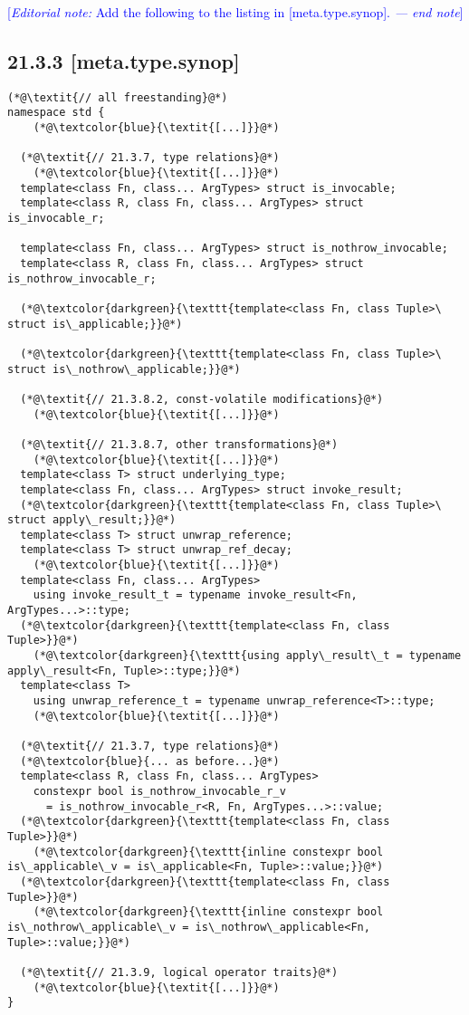 \documentclass{article}
\begin{document}
\textcolor{blue}{[\textit{Editorial note:} Add the following to the listing in [meta.type.synop]. \textit{--- end note}]}

\subsection*{21.3.3 [meta.type.synop]}
\begin{lstlisting}[style=base]
(*@\textit{// all freestanding}@*)
namespace std {
    (*@\textcolor{blue}{\textit{[...]}}@*)

  (*@\textit{// 21.3.7, type relations}@*)
    (*@\textcolor{blue}{\textit{[...]}}@*)
  template<class Fn, class... ArgTypes> struct is_invocable;
  template<class R, class Fn, class... ArgTypes> struct is_invocable_r;

  template<class Fn, class... ArgTypes> struct is_nothrow_invocable;
  template<class R, class Fn, class... ArgTypes> struct is_nothrow_invocable_r;

  (*@\textcolor{darkgreen}{\texttt{template<class Fn, class Tuple>\ struct is\_applicable;}}@*)

  (*@\textcolor{darkgreen}{\texttt{template<class Fn, class Tuple>\ struct is\_nothrow\_applicable;}}@*)
  
  (*@\textit{// 21.3.8.2, const-volatile modifications}@*)
    (*@\textcolor{blue}{\textit{[...]}}@*)

  (*@\textit{// 21.3.8.7, other transformations}@*)
    (*@\textcolor{blue}{\textit{[...]}}@*)
  template<class T> struct underlying_type;
  template<class Fn, class... ArgTypes> struct invoke_result;
  (*@\textcolor{darkgreen}{\texttt{template<class Fn, class Tuple>\ struct apply\_result;}}@*)
  template<class T> struct unwrap_reference;
  template<class T> struct unwrap_ref_decay;
    (*@\textcolor{blue}{\textit{[...]}}@*)
  template<class Fn, class... ArgTypes>
    using invoke_result_t = typename invoke_result<Fn, ArgTypes...>::type;
  (*@\textcolor{darkgreen}{\texttt{template<class Fn, class Tuple>}}@*)
    (*@\textcolor{darkgreen}{\texttt{using apply\_result\_t = typename apply\_result<Fn, Tuple>::type;}}@*)
  template<class T>
    using unwrap_reference_t = typename unwrap_reference<T>::type;
    (*@\textcolor{blue}{\textit{[...]}}@*)

  (*@\textit{// 21.3.7, type relations}@*)
  (*@\textcolor{blue}{... as before...}@*)
  template<class R, class Fn, class... ArgTypes>
    constexpr bool is_nothrow_invocable_r_v
      = is_nothrow_invocable_r<R, Fn, ArgTypes...>::value;
  (*@\textcolor{darkgreen}{\texttt{template<class Fn, class Tuple>}}@*)
    (*@\textcolor{darkgreen}{\texttt{inline constexpr bool is\_applicable\_v = is\_applicable<Fn, Tuple>::value;}}@*)
  (*@\textcolor{darkgreen}{\texttt{template<class Fn, class Tuple>}}@*)
    (*@\textcolor{darkgreen}{\texttt{inline constexpr bool is\_nothrow\_applicable\_v = is\_nothrow\_applicable<Fn, Tuple>::value;}}@*)

  (*@\textit{// 21.3.9, logical operator traits}@*)
    (*@\textcolor{blue}{\textit{[...]}}@*)
}
\end{lstlisting}
\end{document}
